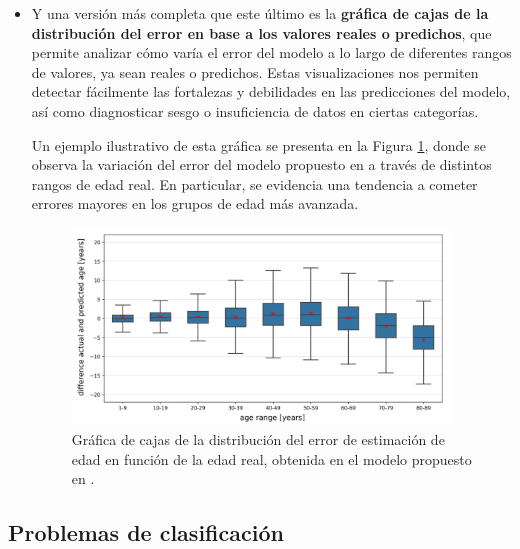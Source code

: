 \begin{itemize}
    \item Y una versión más completa que este último es la \textbf{gráfica de cajas de la distribución del error 
    en base a los valores reales o predichos}, que permite analizar cómo varía el error del modelo a lo largo de 
    diferentes rangos de valores, ya sean reales o predichos. Estas visualizaciones nos permiten detectar 
    fácilmente las fortalezas y debilidades en las predicciones del modelo, así como diagnosticar sesgo o 
    insuficiencia de datos en ciertas categorías.
    
    Un ejemplo ilustrativo de esta gráfica se presenta en la Figura \ref{fig:boxplot_error_vs_act_AE}, donde se 
    observa la variación del error del modelo propuesto en \cite{heinrich2024} a través de distintos rangos de edad real. 
    En particular, se evidencia una tendencia a cometer errores mayores en los grupos de edad más avanzada.

    \begin{figure}[h]
        \centering
        \includegraphics[width=0.95\textwidth]{capitulos/cap_02/imagenes/boxplot_error_vs_act_AE.png}
        \caption{Gráfica de cajas de la distribución del error de estimación de edad en función de la edad real, 
        obtenida en el modelo propuesto en \cite{heinrich2024}.} 
        \label{fig:boxplot_error_vs_act_AE}
    \end{figure}

\end{itemize}







\subsection{Problemas de clasificación}

